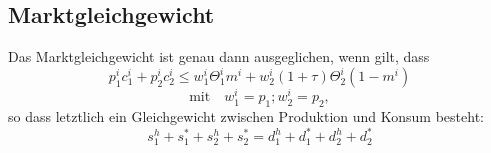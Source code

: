 \subsection{Marktgleichgewicht} 
Das Marktgleichgewicht ist genau dann ausgeglichen, wenn gilt, dass 
\begin{equation} p_1^ic_1^i+p_2^ic_2^i\leq w_1^i\Theta_1 ^im^i+w_2^i(1+\tau)\Theta_2^i(1-m^i)\end{equation} 
\begin{displaymath}\text{mit}\quad w_1^i=p_1; w_2^i=p_2,\end{displaymath} so dass letztlich ein Gleichgewicht zwischen Produktion und Konsum besteht: 
\begin{equation}s_1^h+s_1^*+s_2^h+s_2^*=d_1^h+d_1^*+d_2^h+d_2^*\end{equation}







%